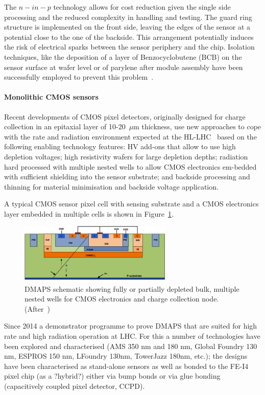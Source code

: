 The $n-in-p$ technology allows for cost reduction given the single side processing and the reduced 
complexity in handling and testing. The guard ring structure is implemented on the front side, leaving the 
edges of the sensor at a potential close to the one of the backside. This arrangement potentially induces the 
risk of electrical sparks between the sensor periphery and the chip. Isolation techniques, like the deposition 
of a layer of Benzocyclobutene (BCB) on the sensor surface at wafer level or of parylene after module 
	assembly have been successfully employed to prevent this problem~\cite{Stefano,UNNO201372}.

\paragraph{Monolithic CMOS sensors}
Recent developments of CMOS pixel detectors, originally designed for charge collection in an epitaxial layer 
of 10-20~$\mu$m thickness, use new approaches to cope with the rate and radiation environment expected 
at the HL-LHC~\cite{PERIC2007876,1748-0221-11-02-C02045,HEMPEREK20158} 
based on the following enabling technology features:
HV add-ons that allow to use high depletion voltages; high resistivity wafers for large depletion depths; 
radiation hard processed with multiple nested wells to allow CMOS electronics em-bedded with sufficient 
shielding into the sensor substrate; and backside processing and
thinning for material minimisation and backside voltage application.

A typical CMOS sensor pixel cell with sensing substrate and a CMOS electronics layer
embedded in multiple cells is shown in Figure~\ref{fig:DMAPS}.

\begin{figure}[!htbp]
   \centering
   \includegraphics[width=0.65\textwidth]{DMAPS.pdf} 
   \caption{\label{fig:DMAPS}DMAPS schematic showing fully or partially depleted bulk, multiple nested wells for CMOS electronics and charge collection node. (After~\cite{ITkStripsTDR})}
   \end{figure}

Since 2014 a demonstrator programme to prove DMAPS that are suited for high rate and high radiation 
operation at LHC. For this a number of technologies have been explored and characterised 
(AMS 350 nm and 180 nm, Global Foundry 130 nm, ESPROS 150 nm, LFoundry 130nm, TowerJazz 
180nm, etc.); the designs have been characterised as stand-alone sensors as well as bonded to the FE-I4 
pixel chip (as a ?hybrid?) either via bump bonds or via glue bonding (capacitively coupled pixel detector, 
CCPD).

